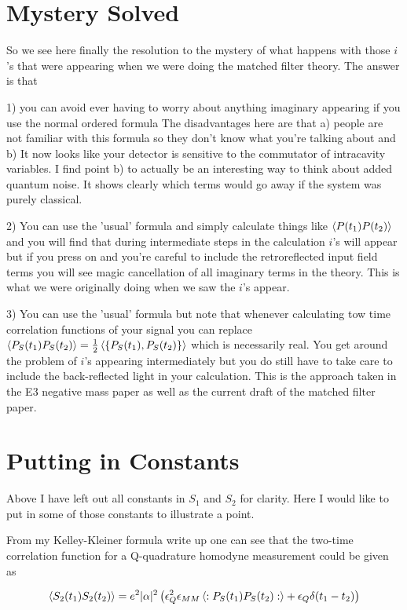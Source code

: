 \documentclass[12pt]{article}
\begin{document}
\section{Mystery Solved}

So we see here finally the resolution to the mystery of what happens with those $i$'s that were appearing when we were doing the matched filter theory. The answer is that 

1) you can avoid ever having to worry about anything imaginary appearing if you use the normal ordered formula The disadvantages here are that a) people are not familiar with this formula so they don't know what you're talking about and b) It now looks like your detector is sensitive to the commutator of intracavity variables. I find point b) to actually be an interesting way to think about added quantum noise. It shows clearly which terms would go away if the system was purely classical.

2) You can use the 'usual' formula and simply calculate things like $\Braket{P(t_1)P(t_2)}$ and you will find that during intermediate steps in the calculation $i$'s will appear but if you press on and you're careful to include the retroreflected input field terms you will see magic cancellation of all imaginary terms in the theory. This is what we were originally doing when we saw the $i$'s appear.

3) You can use the 'usual' formula but note that whenever calculating tow time correlation functions of your signal you can replace $\Braket{P_S(t_1)P_S(t_2)} = \frac{1}{2}\Braket{\{P_S(t_1),P_S(t_2)\}}$ which is necessarily real. You get around the problem of $i$'s appearing intermediately but you do still have to take care to include the back-reflected light in your calculation. This is the approach taken in the E3 negative mass paper as well as the current draft of the matched filter paper.

\section{Putting in Constants}

Above I have left out all constants in $S_1$ and $S_2$ for clarity. Here I would like to put in some of those constants to illustrate a point.

From my Kelley-Kleiner formula write up one can see that the two-time correlation function for a Q-quadrature homodyne measurement could be given as

\begin{align}
\Braket{S_2(t_1)S_2(t_2)} = e^2 |\alpha|^2\left(\epsilon_Q^2\epsilon_{MM}\Braket{:P_S(t_1)P_S(t_2):}+ \epsilon_Q\delta(t_1-t_2)\right) 
\end{align}
\end{document}
